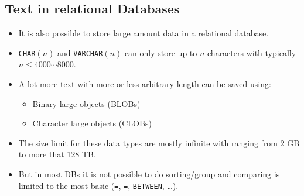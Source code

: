 \documentclass[a4paper, 11pt, accentcolor = tud3b]{tudreport}
\begin{document}
            \subsection{Text in relational Databases} %
            	\begin{itemize}
            		\item It is also possible to store large amount data in a relational database.
            		\item \lstinline|CHAR|\((n)\) and \lstinline|VARCHAR|\((n)\) can only store up to \(n\) characters with typically \( n \leq 4000\cdots8000 \).
            		\item A lot more text with more or less arbitrary length can be saved using:
            			\begin{itemize}
            				\item Binary large objects (BLOBs)
            				\item Character large objects (CLOBs)
            			\end{itemize}
            		\item The size limit for these data types are mostly infinite with ranging from 2 GB to more that 128 TB.
            		\item But in most DBs it is not possible to do sorting/group and comparing is limited to the most basic (\lstinline|=|, \lstinline|=|, \lstinline|BETWEEN|, \dots).
            	\end{itemize}
\end{document}
